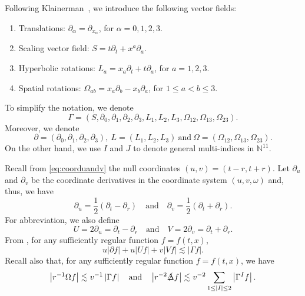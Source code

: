 \documentclass[a4paper,reqno]{amsart}
\theoremstyle{definition}
\numberwithin{equation}{section}
\def \pt{\partial_{t}}
\def \pr{\partial_{r}}
\def\Deltas{\slashed{\Delta}}
\def\lab{\label}
\begin{document}
\smallskip
Following Klainerman~\cite{Klainerman86}, we introduce the following vector fields:

\begin{enumerate}
	
		\smallskip
	\item [(i)]  Translations: $\partial_{\alpha}=\partial_{x_{\alpha}}$, for $\alpha=0,1,2,3$.
	
	\smallskip
	\item [(ii)] Scaling vector field: $S=t\partial_{t}+x^{a}\partial_{a}$.
	
	\smallskip
	\item [(iii)] Hyperbolic rotations: $L_{a}=x_{a}\partial_{t}+t\partial_{a}$, for $a=1,2,3$.
	
	\smallskip
	\item [(iv)] Spatial rotations: $\Omega_{ab}=x_{a}\partial_{b}-x_{b}\partial_{a}$, for $1\le a<b\le 3$.
\end{enumerate}
To simplify the notation, we denote 
\begin{equation*}
    \Gamma = (S,\partial_{0},\partial_{1},\partial_{2},\partial_{3}, L_1, L_2, L_3, \Omega_{12}, \Omega_{13}, \Omega_{23}).
\end{equation*}
Moreover, we denote 
\begin{equation*}
\partial=\left(\partial_{0},\partial_{1},\partial_{2},\partial_{3}\right),\ 
L=\left(L_{1},L_{2},L_{3}\right)\ \mbox{and}\
\Omega=\left(\Omega_{12},\Omega_{13},\Omega_{23}\right).
\end{equation*}
On the other hand, we use $I$ and $J$ to denote general multi-indices in   $\mathbb{N}^{11}$. 

\smallskip
Recall from \eqref{eq:coorduandv} the null coordinates $(u,v)=(t-r,t+r)$. 
Let $\partial_u$ and $\partial_v$ be the coordinate derivatives in the coordinate system $(u,v, \omega)$ and, thus, we have
\begin{equation*}
    \partial_{u}=\frac{1}{2}(\pt -\pr)\quad \mbox{and}\quad 
    \partial_{v}=\frac{1}{2}(\pt +\pr ).
\end{equation*}
For abbreviation, we also define
\begin{equation}
\lab{def:UandV}
    U=2\partial_{u}=\pt -\pr\quad \mbox{and}\quad 
    V=2\partial_{v}=\pt +\pr . 
\end{equation}
From \cite[Theorem 5.10]{AlinhacBook}, for any sufficiently regular function $f=f(t,x)$, 
\begin{equation}\label{est:t-rpoint}
   u \left|\partial f\right|+u\left|Uf\right|
   +
    v|Vf|\lesssim |\Gamma f|.
\end{equation}
Recall also that, for any sufficiently regular function $f=f(t,x)$, we have 
\begin{equation}\label{est:Omega}
    \left|r^{-1}\Omega f\right|\lesssim v^{-1}\left|\Gamma f\right|\quad \mbox{and}\quad 
    \left|r^{-2}\Deltas f\right|\lesssim v^{-2}\sum_{1\leq |I|\leq 2}\left|\Gamma^I f\right|.
\end{equation}
\end{document}
